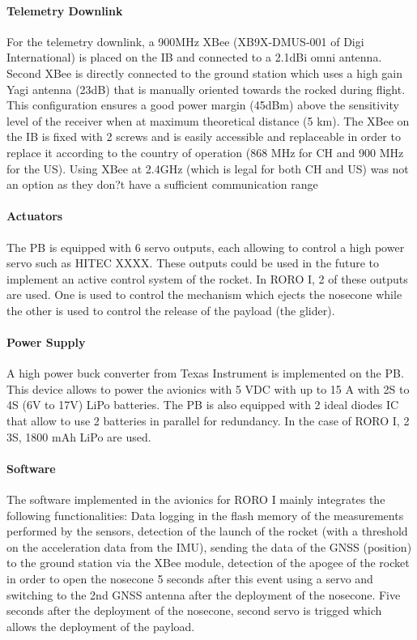 \paragraph{Telemetry Downlink}
For the telemetry downlink, a 900MHz XBee (XB9X-DMUS-001 of Digi International) is placed on the IB and connected to a 2.1dBi omni antenna. Second XBee is directly connected to the ground station which uses a high gain Yagi antenna (23dB) that is manually oriented towards the rocked during flight. This configuration ensures a good power margin (45dBm) above the sensitivity level of the receiver when at maximum theoretical distance (5 km). The XBee on the IB is fixed with 2 screws and is easily accessible and replaceable in order to replace it according to the country of operation (868 MHz for CH and 900 MHz for the US). Using XBee at 2.4GHz (which is legal for both CH and US) was not an option as they don?t have a sufficient communication range

\paragraph{Actuators}
The PB is equipped with 6 servo outputs, each allowing to control a high power servo such as HITEC XXXX. These outputs could be used in the future to implement an active control system of the rocket. In RORO I, 2 of these outputs are used. One is used to control the mechanism which ejects the nosecone while the other is used to control the release of the payload (the glider). 

\paragraph{Power Supply}
A high power buck converter from Texas Instrument is implemented on the PB. This device allows to power the avionics with 5 VDC with up to 15 A with 2S to 4S (6V to 17V) LiPo batteries. The PB is also equipped with 2 ideal diodes IC that allow to use 2 batteries in parallel for redundancy. In the case of RORO I, 2 3S, 1800 mAh LiPo are used. 

\paragraph{Software}
The software implemented in the avionics for RORO I mainly integrates the following functionalities: Data logging in the flash memory of the measurements performed by the sensors, detection of the launch of the rocket (with a threshold on the acceleration data from the IMU), sending the data of the GNSS (position) to the ground station via the XBee module, detection of the apogee of the rocket in order to open the nosecone 5 seconds after this event using a servo and switching to the 2nd GNSS antenna after the deployment of the nosecone. Five seconds after the deployment of the nosecone, second servo is trigged which allows the deployment of the payload.

